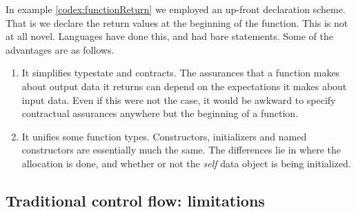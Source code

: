 \documentclass[10pt]{amsart}
\begin{document}
In example \ref{codex:functionReturn} we employed an up-front
declaration scheme.  That is we declare the return values at the
beginning of the function.  This is not at all novel.  Languages have
done this, and had bare \texttt{} statements.  Some of the
advantages are as follows.
\begin{enumerate}
\item It simplifies typestate and contracts.  The assurances that a
  function makes about output data it returns can depend on the
  expectations it makes about input data.  Even if this were not the
  case, it would be awkward to specify contractual assurances anywhere
  but the beginning of a function.
\item It unifies some function types.  Constructors, initializers and
  named constructors are essentially much the same.  The differences
  lie in where the allocation is done, and whether or not the
  \emph{self} data object is being initialized.
\end{enumerate}



\subsection{Traditional control flow: limitations}
\end{document}
